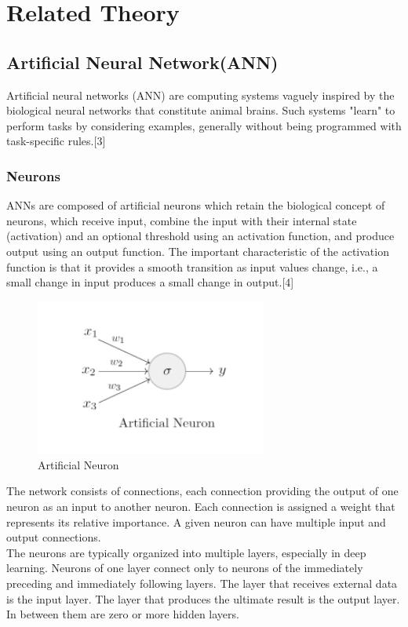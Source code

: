    


\section{Related Theory}
\subsection{Artificial Neural Network(ANN)}
Artificial neural networks (ANN) are computing systems vaguely inspired by the biological neural networks that constitute animal brains. Such systems "learn" to perform tasks by considering examples, generally without being programmed with
task-specific rules\cite{bordia2020automated}.[3]

\subsubsection{Neurons}
ANNs are composed of artificial neurons which retain the biological concept of
neurons, which receive input, combine the input with their internal state
(activation) and an optional threshold using an activation function, and produce
output using an output function. The important characteristic of the activation
function is that it provides a smooth transition as input values change, i.e., a small change in input produces a small change in output.[4]

\begin{figure}[tbh] %
\begin{center}
	\includegraphics[width = 3in]{images/artificialneuron.png}
	\caption{Artificial Neuron} %
	\label{figArtificialNeuron} %
\end{center}
\end{figure}

The network consists of connections, each connection providing the output of one
neuron as an input to another neuron. Each connection is assigned a weight that
represents its relative importance. A given neuron can have multiple input and
output connections.\\
The neurons are typically organized into multiple layers, especially in deep
learning. Neurons of one layer connect only to neurons of the immediately
preceding and immediately following layers. The layer that receives external data
is the input layer. The layer that produces the ultimate result is the output layer. In
between them are zero or more hidden layers.

